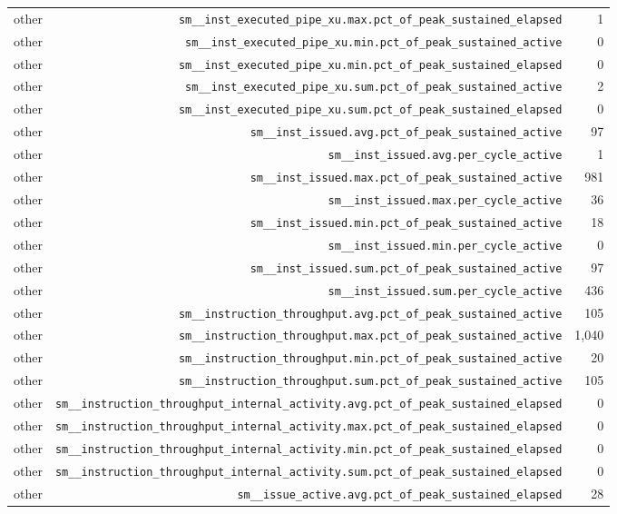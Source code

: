 \begin{table}[h]
\begin{tabular}{|l|r|r|}
other & \texttt{sm__inst_executed_pipe_xu.max.pct_of_peak_sustained_elapsed} & 1 \\
other & \texttt{sm__inst_executed_pipe_xu.min.pct_of_peak_sustained_active} & 0 \\
other & \texttt{sm__inst_executed_pipe_xu.min.pct_of_peak_sustained_elapsed} & 0 \\
other & \texttt{sm__inst_executed_pipe_xu.sum.pct_of_peak_sustained_active} & 2 \\
other & \texttt{sm__inst_executed_pipe_xu.sum.pct_of_peak_sustained_elapsed} & 0 \\
other & \texttt{sm__inst_issued.avg.pct_of_peak_sustained_active} & 97 \\
other & \texttt{sm__inst_issued.avg.per_cycle_active} & 1 \\
other & \texttt{sm__inst_issued.max.pct_of_peak_sustained_active} & 981 \\
other & \texttt{sm__inst_issued.max.per_cycle_active} & 36 \\
other & \texttt{sm__inst_issued.min.pct_of_peak_sustained_active} & 18 \\
other & \texttt{sm__inst_issued.min.per_cycle_active} & 0 \\
other & \texttt{sm__inst_issued.sum.pct_of_peak_sustained_active} & 97 \\
other & \texttt{sm__inst_issued.sum.per_cycle_active} & 436 \\
other & \texttt{sm__instruction_throughput.avg.pct_of_peak_sustained_active} & 105 \\
other & \texttt{sm__instruction_throughput.max.pct_of_peak_sustained_active} & 1,040 \\
other & \texttt{sm__instruction_throughput.min.pct_of_peak_sustained_active} & 20 \\
other & \texttt{sm__instruction_throughput.sum.pct_of_peak_sustained_active} & 105 \\
other & \texttt{sm__instruction_throughput_internal_activity.avg.pct_of_peak_sustained_elapsed} & 0 \\
other & \texttt{sm__instruction_throughput_internal_activity.max.pct_of_peak_sustained_elapsed} & 0 \\
other & \texttt{sm__instruction_throughput_internal_activity.min.pct_of_peak_sustained_elapsed} & 0 \\
other & \texttt{sm__instruction_throughput_internal_activity.sum.pct_of_peak_sustained_elapsed} & 0 \\
other & \texttt{sm__issue_active.avg.pct_of_peak_sustained_elapsed} & 28 \\

\end{tabular}
\end{table}

